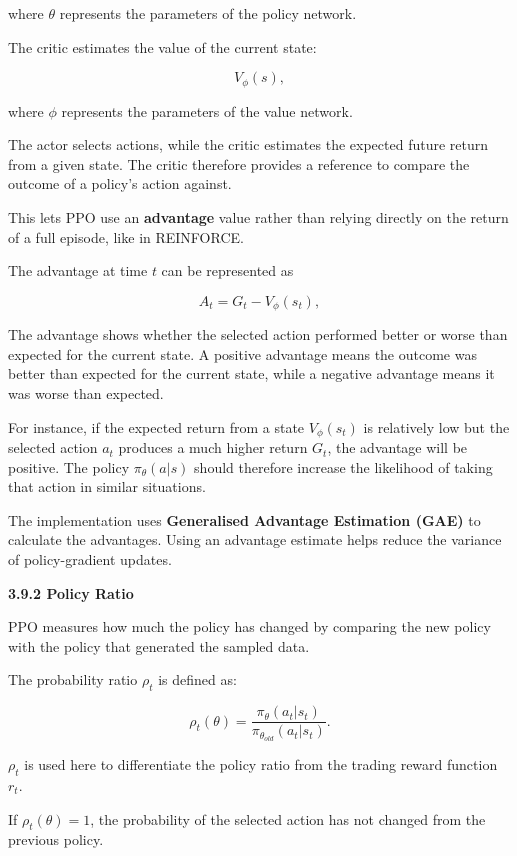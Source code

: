 where \(\theta\) represents the parameters of the policy network.

The critic estimates the value of the current state:

\[V_{\phi}(s),\]

where \(\phi\) represents the parameters of the value network.

The actor selects actions, while the critic estimates the expected
future return from a given state. The critic therefore provides a
reference to compare the outcome of a policy's action against.

This lets PPO use an \textbf{advantage} value rather than relying
directly on the return of a full episode, like in REINFORCE.

The advantage at time \(t\) can be represented as

\[A_{t} = G_{t} - V_{\phi}\left( s_{t} \right),\]

The advantage shows whether the selected action performed better or
worse than expected for the current state. A positive advantage means
the outcome was better than expected for the current state, while a
negative advantage means it was worse than expected.

For instance, if the expected return from a state
\(V_{\phi}\left( s_{t} \right)\) is relatively low but the selected
action \(a_{t}\) produces a much higher return \(G_{t}\), the advantage
will be positive. The policy \(\pi_{\theta}\left( a|s \right)\) should
therefore increase the likelihood of taking that action in similar
situations.

The implementation uses \textbf{Generalised Advantage Estimation (GAE)}
to calculate the advantages. Using an advantage estimate helps reduce
the variance of policy-gradient updates.

\textbf{3.9.2 Policy Ratio}

PPO measures how much the policy has changed by comparing the new policy
with the policy that generated the sampled data.

The probability ratio \(\rho_{t}\) is defined as:

\[\rho_{t}(\theta) = \frac{\pi_{\theta}\left( a_{t}|s_{t} \right)}{\pi_{\theta_{old}}\left( a_{t}|s_{t} \right)}.\]

\(\rho_{t}\) is used here to differentiate the policy ratio from the
trading reward function \(r_{t}\).

If \(\rho_{t}(\theta) = 1\), the probability of the selected action has
not changed from the previous policy.

